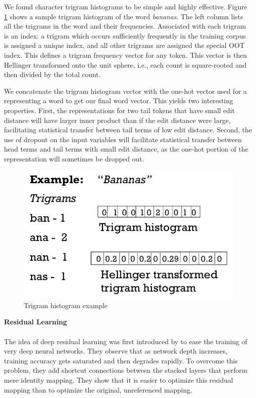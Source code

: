 \documentclass[11pt]{article}
\begin{document}
We found character trigram histograms to be simple and highly effective.
Figure \ref{trigram_histogram} shows a sample trigram histogram of the
word \textit{bananas}. The left column lists all the trigrams in the
word and their frequencies.  Associated with each trigram is an index:
a trigram which occurs sufficiently frequently in the training corpus is
assigned a unique index, and all other trigrams are assigned the special
OOT index.  This defines a trigram frequency vector for any token.
This vector is then Hellinger transformed \cite{legendre2001ecologically} onto the unit sphere,
i.e., each count is square-rooted and then divided by the total count.

We concatenate the trigram histogram vector with the one-hot vector used
for a representing a word to get our final word vector.  This yields
two interesting properties.  First, the representations for two tail
tokens that have small edit distance will have larger inner product
than if the edit distance were large, facilitating statistical transfer
between tail terms of low edit distance.  Second, the use of dropout on
the input variables will facilitate statistical transfer between head
terms and tail terms with small edit distance, as the one-hot portion
of the representation will sometimes be dropped out.

\begin{figure}\label{trigram_histogram}
\includegraphics[scale=0.3]{TrigramHistogram}
\caption{Trigram histogram example}
\end{figure}

\textbf{Residual Learning} \label{residual_learning}\\\\

The idea of deep residual learning was first introduced by \cite{he2015deep} to ease the training of very deep neural networks. They observe that as network depth increases, training accuracy gets saturated and then degrades rapidly. To overcome this problem, they add shortcut connections between the stacked layers that perform mere identity mapping. They show that it is easier to optimize this residual mapping than to optimize the original, unreferenced mapping.
\end{document}
